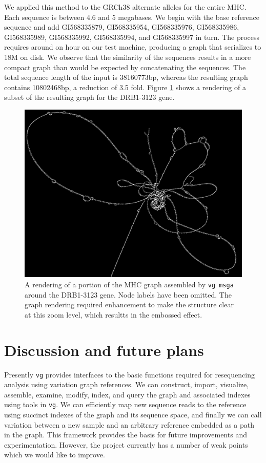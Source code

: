 \documentclass{article}
\begin{document}
We applied this method to the GRCh38 alternate alleles for the entire MHC.
Each sequence is between 4.6 and 5 megabases.
We begin with the base reference sequence and add GI568335879, GI568335954, GI568335976, GI568335986, GI568335989, GI568335992, GI568335994, and GI568335997 in turn.
The process requires around on hour on our test machine, producing a graph that serializes to 18M on disk.
We observe that the similarity of the sequences results in a more compact graph than would be expected by concatenating the sequences.
The total sequence length of the input is 38160773bp, whereas the resulting graph contains 10802468bp, a reduction of 3.5 fold.
Figure \ref{fig:DRB1-3123} shows a rendering of a subset of the resulting graph for the DRB1-3123 gene.

\begin{figure}[t]
\centering
\includegraphics[width=1.0\textwidth]{figures/DRB1-3123}
\caption{\label{fig:DRB1-3123}
  A rendering of a portion of the MHC graph assembled by {\tt vg msga} around the DRB1-3123 gene.
  Node labels have been omitted. The graph rendering required enhancement to make the structure clear at this zoom level, which resultts in the embossed effect.
}
\end{figure}

\section{Discussion and future plans}

Presently {\tt vg} provides interfaces to the basic functions required for resequencing analysis using variation graph references.
We can construct, import, visualize, assemble, examine, modify, index, and query the graph and associated indexes using tools in {\tt vg}.
We can efficiently map new sequence reads to the reference using succinct indexes of the graph and its sequence space, and finally we can call variation between a new sample and an arbitrary reference embedded as a path in the graph.
This framework provides the basis for future improvements and experimentation.
However, the project currently has a number of weak points which we would like to improve.
\end{document}
